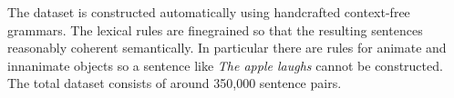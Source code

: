 The dataset is constructed automatically using handcrafted context-free grammars. The lexical rules are finegrained so that the resulting sentences reasonably coherent semantically. In particular there are rules for animate and innanimate objects so a sentence like \textit{The apple laughs} cannot be constructed. The total dataset consists of around 350,000 sentence pairs.

